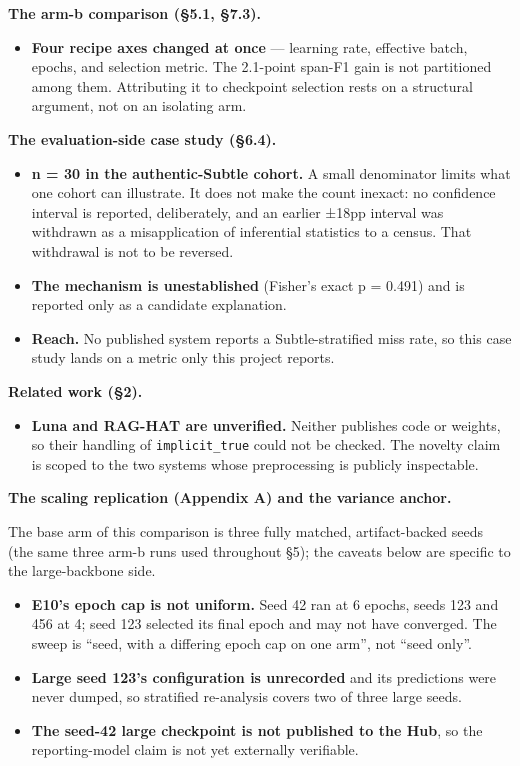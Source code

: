 \documentclass[11pt]{article}
\providecommand{\tightlist}{\setlength{\itemsep}{0pt}\setlength{\parskip}{0pt}}
\begin{document}
\textbf{The arm-b comparison (§5.1, §7.3).}

\begin{itemize}
\tightlist
\item
  \textbf{Four recipe axes changed at once} --- learning rate, effective batch, epochs, and
  selection metric. The 2.1-point span-F1 gain is not partitioned among them. Attributing
  it to checkpoint selection rests on a structural argument, not on an isolating arm.
\end{itemize}

\textbf{The evaluation-side case study (§6.4).}

\begin{itemize}
\tightlist
\item
  \textbf{n = 30 in the authentic-Subtle cohort.} A small denominator limits what one cohort can
  illustrate. It does not make the count inexact: no confidence interval is reported,
  deliberately, and an earlier ±18pp interval was withdrawn as a misapplication of
  inferential statistics to a census. That withdrawal is not to be reversed.
\item
  \textbf{The mechanism is unestablished} (Fisher's exact p = 0.491) and is reported only as a
  candidate explanation.
\item
  \textbf{Reach.} No published system reports a Subtle-stratified miss rate, so this case study
  lands on a metric only this project reports.
\end{itemize}

\textbf{Related work (§2).}

\begin{itemize}
\tightlist
\item
  \textbf{Luna and RAG-HAT are unverified.} Neither publishes code or weights, so their handling
  of \texttt{implicit\_true} could not be checked. The novelty claim is scoped to the two systems
  whose preprocessing is publicly inspectable.
\end{itemize}

\textbf{The scaling replication (Appendix A) and the variance anchor.}

The base arm of this comparison is three fully matched, artifact-backed seeds (the same
three arm-b runs used throughout §5); the caveats below are specific to the large-backbone
side.

\begin{itemize}
\tightlist
\item
  \textbf{E10's epoch cap is not uniform.} Seed 42 ran at 6 epochs, seeds 123 and 456 at 4; seed
  123 selected its final epoch and may not have converged. The sweep is ``seed, with a
  differing epoch cap on one arm'', not ``seed only''.
\item
  \textbf{Large seed 123's configuration is unrecorded} and its predictions were never dumped, so
  stratified re-analysis covers two of three large seeds.
\item
  \textbf{The seed-42 large checkpoint is not published to the Hub}, so the reporting-model claim
  is not yet externally verifiable.
\end{itemize}
\end{document}

